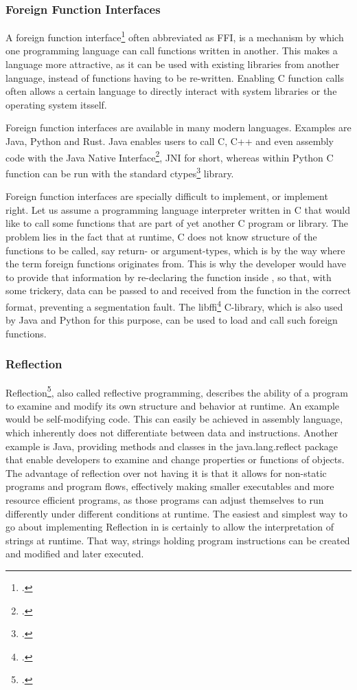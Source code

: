 \documentclass[12pt,a4paper,man]{apa7}
\begin{document}
\subsubsection{Foreign Function Interfaces}
A foreign function interface\footcite{FFI} often abbreviated as FFI,
is a mechanism by which one programming language can call functions written 
in another. This makes a language more attractive, as it can be used with
existing libraries from another language, instead of functions having to be
re-written. Enabling C function calls often allows a certain language to
directly interact with system libraries or the operating system itsself.

Foreign function interfaces are available in many modern languages.
Examples are Java, Python and Rust.
Java enables users to call C, C++ and even assembly code with the Java Native
Interface\footcite{JNI}, JNI for short, whereas within Python C function can
be run with the standard ctypes\footcite{ctypes} library.

Foreign function interfaces are specially difficult to implement, or implement
right. Let us assume a programming language interpreter \name written in C that
would like to call some functions that are part of yet another C program or
library. The problem lies in the fact that at runtime, C does not know
structure of the functions to be called, say return- or argument-types, which
is by the way where the term foreign functions originates from. This is why the
\name developer would have to provide that information by re-declaring the
function inside \name, so that, with some trickery, data can be passed to and
received from the function in the correct format, preventing a segmentation
fault. The libffi\footcite{libffi} C-library, which is also used by Java and
Python for this purpose, can be used to load and call such foreign functions.

\subsubsection{Reflection}
Reflection\footcite{reflection}, also called reflective programming, describes
the ability of a program to examine and modify its own structure and behavior 
at runtime. An example would be self-modifying code. This can easily be
achieved in assembly language, which inherently does not differentiate between
data and instructions.
Another example is Java, providing methods and classes in the java.lang.reflect
package that enable developers to examine and change properties or functions
of objects.
The advantage of reflection over not having it is that it allows for non-static
programs and program flows, effectively making smaller executables and more
resource efficient programs, as those programs can adjust themselves to run
differently under different conditions at runtime.
The easiest and simplest way to go about implementing Reflection in \name is
certainly to allow the interpretation of strings at runtime. That way, strings
holding program instructions can be created and modified and later executed.
\end{document}
